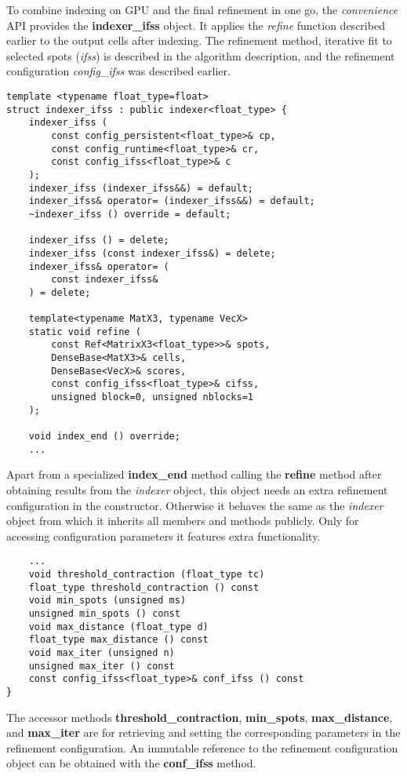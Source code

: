 \documentclass[a4paper,10pt]{article}
\begin{document}
To combine indexing on GPU and the final refinement in one go, the \emph{convenience} API provides the \textbf{indexer\_ifss} object. It applies the \emph{refine} function described earlier to the output cells after indexing. The refinement method, iterative fit to selected spots (\emph{ifss}) is described in the algorithm description, and the refinement configuration \emph{config\_ifss} was described earlier.
%
\begin{lstlisting}
template <typename float_type=float>
struct indexer_ifss : public indexer<float_type> {
    indexer_ifss (
        const config_persistent<float_type>& cp,
        const config_runtime<float_type>& cr,
        const config_ifss<float_type>& c
    );
    indexer_ifss (indexer_ifss&&) = default;
    indexer_ifss& operator= (indexer_ifss&&) = default;
    ~indexer_ifss () override = default;

    indexer_ifss () = delete;
    indexer_ifss (const indexer_ifss&) = delete;
    indexer_ifss& operator= (
        const indexer_ifss&
    ) = delete;

    template<typename MatX3, typename VecX>
    static void refine (
        const Ref<MatrixX3<float_type>>& spots,
        DenseBase<MatX3>& cells,
        DenseBase<VecX>& scores,
        const config_ifss<float_type>& cifss,
        unsigned block=0, unsigned nblocks=1
    );

    void index_end () override;
    ...
\end{lstlisting}
%
Apart from a specialized \textbf{index\_end} method calling the \textbf{refine} method after obtaining results from the \emph{indexer} object, this object needs an extra refinement configuration in the constructor. Otherwise it behaves the same as the \emph{indexer} object from which it inherits all members and methods publicly. Only for accessing configuration parameters it features extra functionality.
%
\begin{lstlisting}
    ...
    void threshold_contraction (float_type tc)
    float_type threshold_contraction () const
    void min_spots (unsigned ms)
    unsigned min_spots () const
    void max_distance (float_type d)
    float_type max_distance () const
    void max_iter (unsigned n)
    unsigned max_iter () const
    const config_ifss<float_type>& conf_ifss () const
}
\end{lstlisting}
%
The accessor methods \textbf{threshold\_contraction}, \textbf{min\_spots}, \textbf{max\_distance}, and \textbf{max\_iter} are for retrieving and setting the corresponding parameters in the refinement configuration. An immutable reference to the refinement configuration object can be obtained with the \textbf{conf\_ifss} method.
\end{document}
